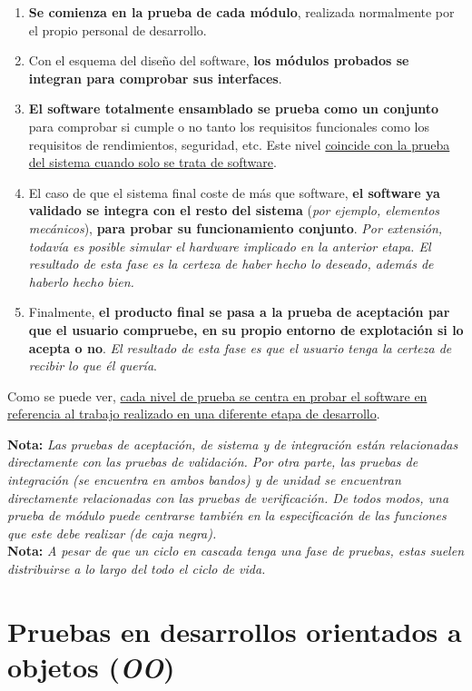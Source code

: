\begin{enumerate}
    \item \textbf{Se comienza en la prueba de cada módulo}, realizada normalmente por el propio personal de desarrollo.
    \item Con el esquema del diseño del software, \textbf{los módulos probados se integran para comprobar sus interfaces}.
    \item \textbf{El software totalmente ensamblado se prueba como un conjunto} para comprobar si cumple o no tanto los requisitos funcionales como los requisitos de rendimientos, seguridad, etc. Este nivel \uline{coincide con la prueba del sistema cuando solo se trata de software}.
    \item El caso de que el sistema final coste de más que software, \textbf{el software ya validado se integra con el resto del sistema} (\textit{por ejemplo, elementos mecánicos}), \textbf{para probar su funcionamiento conjunto}. \textit{Por extensión, todavía es posible simular el hardware implicado en la anterior etapa. El resultado de esta fase es la certeza de haber hecho lo deseado, además de haberlo hecho bien.}
    \item Finalmente, \textbf{el producto final se pasa a la prueba de aceptación par que el usuario compruebe, en su propio entorno de explotación si lo acepta o no}. \textit{El resultado de esta fase es que el usuario tenga la certeza de recibir lo que él quería}.
\end{enumerate}

Como se puede ver, \uline{cada nivel de prueba se centra en probar el software en referencia al trabajo realizado en una diferente etapa de desarrollo}.

\textbf{Nota:} \textit{Las pruebas de aceptación, de sistema y de integración están relacionadas directamente con las pruebas de validación. Por otra parte, las pruebas de integración (se encuentra en ambos bandos) y de unidad se encuentran directamente relacionadas con las pruebas de verificación. De todos modos, una prueba de módulo puede centrarse también en la especificación de las funciones que este debe realizar (de caja negra).}\\

\textbf{Nota:} \textit{A pesar de que un ciclo en cascada tenga una fase de pruebas, estas suelen distribuirse a lo largo del todo el ciclo de vida.}\\


\section{Pruebas en desarrollos orientados a objetos (\textit{OO})}

